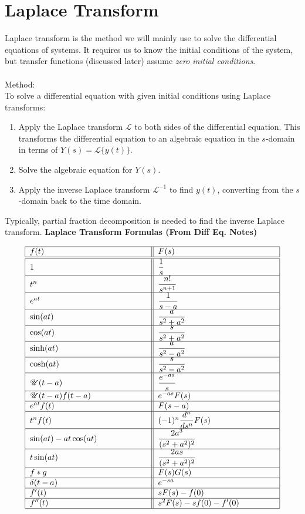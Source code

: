 \documentclass[12pt]{article}
\begin{document}
\section*{Laplace Transform}
Laplace transform is the method we will mainly use to solve the differential equations of systems. It requires us to know the initial conditions of the system, but transfer functions (discussed later) assume \textit{zero initial conditions}.\\\\
Method:\\
To solve a differential equation with given initial conditions using Laplace transforms:
\begin{enumerate}  
    \item Apply the Laplace transform $\mathscr{L}$ to both sides of the differential equation. This transforms the differential equation to an algebraic equation in the $s$-domain in terms of $Y(s)=\mathscr{L}\{y(t)\}$.
    
    \item Solve the algebraic equation for $Y(s)$.
    
    \item Apply the inverse Laplace transform $\mathscr{L}^{-1}$ to find $y(t)$, converting from the $s$-domain back to the time domain.
\end{enumerate}
Typically, partial fraction decomposition is needed to find the inverse Laplace transform.
\newpage\noindent
\textbf{Laplace Transform Formulas (From Diff Eq. Notes)}
\begin{center}
\renewcommand{\arraystretch}{2}
\[
\begin{tabular}{|p{5cm}||p{5cm}|}
\hline
$f(t)$ & $F(s)$ \\
\hline\hline
$1$ & $\dfrac{1}{s}$ \\
\hline
$t^{n}$ & $\dfrac{n!}{s^{n+1}}$ \\
\hline
$e^{at}$ & $\dfrac{1}{s-a}$ \\
\hline
$\sin(at)$ & $\dfrac{a}{s^{2}+a^{2}}$ \\
\hline
$\cos(at)$ & $\dfrac{s}{s^{2}+a^{2}}$ \\
\hline
$\sinh(at)$ & $\dfrac{a}{s^{2}-a^{2}}$ \\
\hline
$\cosh(at)$ & $\dfrac{s}{s^{2}-a^{2}}$ \\
\hline
$\mathscr{U}(t-a)$ & $\dfrac{e^{-as}}{s}$ \\
\hline
$\mathscr{U}(t-a)f(t-a)$ & $e^{-as}F(s)$ \\
\hline
$e^{at}f(t)$ & $F(s-a)$ \\
\hline
$t^n f(t)$ & $(-1)^n\dfrac{d^n}{ds^n}F(s)$ \\
\hline
$\sin(at)-at\cos(at)$ & $\dfrac{2a^3}{(s^2+a^2)^2}$ \\
\hline
$t\sin(at)$ & $\dfrac{2as}{(s^2+a^2)^2}$ \\
\hline
$f * g$ & $F(s)G(s)$ \\
\hline
$\delta(t-a)$ & $e^{-sa}$ \\
\hline
$f'(t)$ & $sF(s)-f(0)$ \\
\hline
$f''(t)$ & $s^2F(s)-sf(0)-f'(0)$ \\
\hline
\end{tabular}
\]
\end{center}
\end{document}
